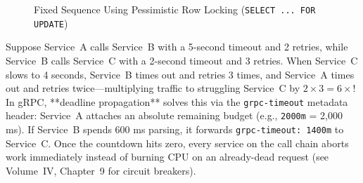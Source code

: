 \begin{figure}[htbp]
\caption{Fixed Sequence Using Pessimistic Row Locking (\texttt{SELECT ... FOR UPDATE})}
\label{fig:v5-ch03-double-spend-fixed}
\end{figure}

\begin{productionwarningbox}
Suppose Service~A calls Service~B with a 5-second timeout and 2 retries, while Service~B calls Service~C with a 2-second timeout and 3 retries. When Service~C slows to 4 seconds, Service~B times out and retries 3 times, and Service~A times out and retries twice---multiplying traffic to struggling Service~C by $2 \times 3 = 6\times$! In gRPC, **deadline propagation** solves this via the \texttt{grpc-timeout} metadata header: Service~A attaches an absolute remaining budget (e.g., \texttt{2000m} = 2,000 ms). If Service~B spends 600 ms parsing, it forwards \texttt{grpc-timeout: 1400m} to Service~C. Once the countdown hits zero, every service on the call chain aborts work immediately instead of burning CPU on an already-dead request (see Volume~IV, Chapter~9 for circuit breakers).
\end{productionwarningbox}

